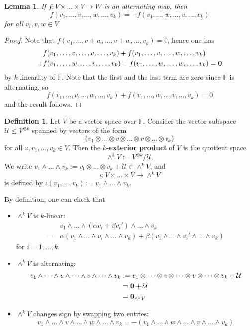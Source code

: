 \documentclass[11pt,openany]{book}
\theoremstyle{plain}
\newtheorem{lemma}[lemma]{Lemma}
\theoremstyle{definition}
\newtheorem{definition}[definition]{Definition}
\theoremstyle{remark}
\begin{document}
\begin{lemma}
    If $f:V \times \dots \times V \to W$ is an alternating map, then
    $$f(v_1, \dots , v , \dots , w , \dots , v_k) = - f(v_1, \dots , w , \dots , v , \dots , v_k)$$
    for all $v_i, v, w \in V$
\end{lemma}
\begin{proof}
    Note that $f(v_1, \dots, v+w, \dots, v+w, \dots, v_k) = 0$, hence one has
\begin{align*}
&f(v_1, \dots, v, \dots, v, \dots, v_k) + f(v_1, \dots, v, \dots, w, \dots, v_k) \\
+ &f(v_1, \dots, w, \dots, v, \dots, v_k) + f(v_1, \dots, w, \dots, w, \dots, v_k) = {\bf 0}    
\end{align*}
by $k$-linearlity of $\mathbb{F}$. Note that the first and the last term are zero since $\mathbb{F}$ is alternating, so
$$f(v_1, \dots, v, \dots, w, \dots, v_k) + f(v_1, \dots, w, \dots, v, \dots, v_k) = 0$$    
and the result follows.
\end{proof}

\begin{definition}
Let $V$ be a vector space over $\mathbb{F}$. Consider the vector subspace $\mathcal{U} \leq V^{\otimes k}$ spanned by vectors of the form
$$\{v_1  \otimes  \dots \otimes v \otimes \dots \otimes v \otimes \dots \otimes  v_k\}$$
for all $v, v_1, \dots, v_k \in V$. Then the {\bf $k$-exterior product} of $V$ is the quotient space
$$\wedge^k V := V^{\otimes k}/\mathcal{U}.$$
We write $v_1 \wedge \dots \wedge v_k := v_1 \otimes \dots \otimes v_k + \mathcal{U} \in \wedge^k V$, and 
$$\iota: V \times \dots \times V \to \wedge^k V$$
is defined by $\iota(v_1, \dots, v_k) := v_1 \wedge \dots \wedge v_k$.
\end{definition}

By definition, one can check that 
\begin{itemize}
    \item $\wedge^k V$ is $k$-linear:
    \begin{align*}
&v_1  \wedge  \dots  \wedge (\alpha v_i + \beta v_i' )  \wedge  \dots  \wedge v_k \\
=\ &\alpha(v_1  \wedge  \dots  \wedge v_i  \wedge  \dots  \wedge v_k) + \beta(v_1  \wedge  \dots  \wedge v_i'  \wedge  \dots  \wedge v_k)\end{align*}
for $i = 1, \dots, k.$
\item $\wedge^k V$ is alternating:
\begin{align*}
v_1  \wedge  \dots  \wedge v  \wedge  \dots  \wedge v  \wedge  \dots  \wedge v_k &:= v_1 \otimes  \dots \otimes v \otimes  \dots \otimes v \otimes  \dots \otimes v_k +\mathcal{U} \\
&= {\bf 0} + \mathcal{U}\\
&= {\bf 0}_{\wedge^k V}
\end{align*}
\item $\wedge^k V$ changes sign by swapping two entries:
$$v_1 \wedge  \dots \wedge v \wedge  \dots \wedge w \wedge  \dots \wedge v_k =-(v_1 \wedge  \dots \wedge w \wedge  \dots \wedge v \wedge  \dots \wedge v_k)$$
\end{itemize}
\end{document}
